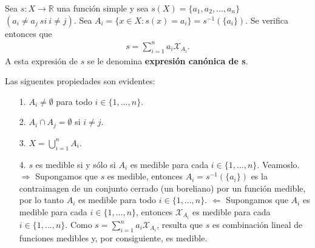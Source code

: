 \begin{defi}
Sea $s: X \longrightarrow \mathbb{R}$ una función simple y sea $s(X) = \{ a_1, a_2, ..., a_n\}$ $(a_i \not = a_j \ si \ i \not = j)$. Sea $A_i = \{ x \in X : s(x) = a_i\} = s^{-1}(\{ a_i \})$. Se verifica entonces que
\begin{align*}
    s = \sum_{i = 1}^{n}{a_i \mathcal{X}_{A_i}}.
\end{align*}
A esta expresión de $s$ se le denomina \textbf{expresión canónica de s}.
\end{defi}
Las siguentes propiedades son evidentes:
\begin{enumerate}
    \item[1.] $A_i \not = \emptyset$ para todo $i \in \{1, ...,n\}$.
    \item[2.] $A_i \cap A_j = \emptyset$ si $i \not = j$.
    \item[3.] $X = \bigcup_{i=1}^{n}{A_i}$.
    \item[4.] $s$ es medible si y sólo si $A_i$ es medible para cada $i \in \{1, ...,n\}$. Veamoslo.
    \\
    \newline
    $\Rightarrow$ Supongamos que $s$ es medible, entonces $A_i = s^{-1}(\{ a_i\})$ es la contraimagen de un conjunto cerrado (un boreliano) por un función medible, por lo tanto $A_i$ es medible para todo $i \in \{1, ...,n\}$.
    \newline
    $\Leftarrow$ Supongamos que $A_i$ es medible para cada $i \in \{1, ...,n\}$, entonces $\mathcal{X}_{A_i}$ es medible para cada $i \in \{1, ...,n\}$. Como $s = \sum_{i = 1}^{n}{a_i \mathcal{X}_{A_i}}$, resulta que $s$ es combinación lineal de funciones medibles y, por consiguiente, es medible.
\end{enumerate}


